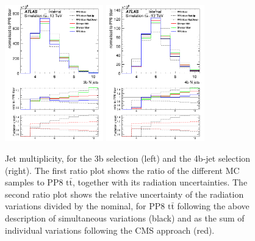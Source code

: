 \begin{figure}[!htb]
\centering
\includegraphics[width=0.38\textwidth]{Plots/ttbb/hisgenNjets_4j3t__div}
\includegraphics[width=0.38\textwidth]{Plots/ttbb/hisgenNjets_4j4t__div}
  \caption{Jet multiplicity, for the 3b selection (left) and the 4b-jet selection (right). The first ratio plot shows the ratio of the different MC samples to PP8 $\mathrm{t\bar{t}}$, together with its radiation uncertainties. The second ratio plot shows the relative uncertainty of the radiation variations divided by the nominal, for PP8 $\mathrm{t\bar{t}}$ following the above description of simultaneous variations (black) and as the sum of individual variations following the CMS approach (red). \label{ttbb:Njets}}
\end{figure}

